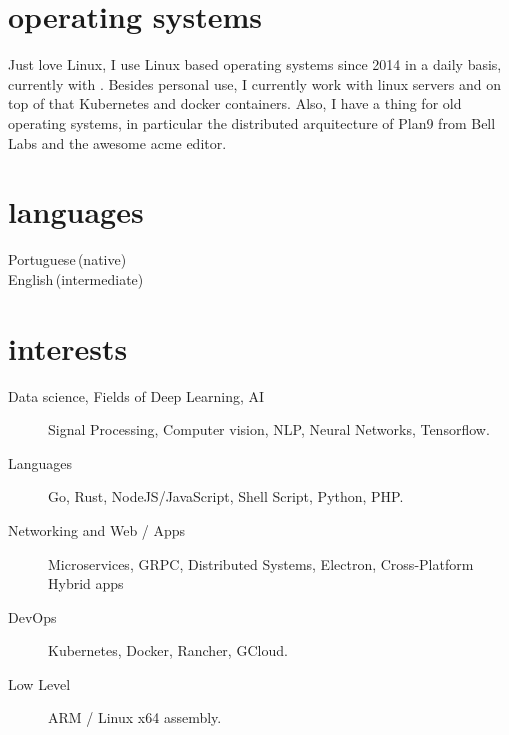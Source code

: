 \documentclass[]{cv-mauri}
\begin{document}
\section*{operating systems}
	Just love Linux, I use Linux based operating systems since 2014 in a daily basis, currently with \href{https://github.com/mauri870/dot-files}{\color{maincolor}{Arch linux and i3wm }}. Besides personal use, I currently work with linux servers and on top of that Kubernetes and docker containers. Also, I have a thing for old operating systems, in particular the distributed arquitecture of Plan9 from Bell Labs and the awesome acme editor.

\section*{languages}
\begin{tabularcv}
    Portuguese\,(native) \\
    English\,(intermediate)
\end{tabularcv}

\section*{interests}
	\begin{description}
		\item [Data science, Fields of Deep Learning, AI] Signal Processing, Computer vision, NLP, Neural Networks, Tensorflow.
		\item [Languages] Go, Rust, NodeJS/JavaScript, Shell Script, Python, PHP.
		\item [Networking and Web / Apps] Microservices, GRPC, Distributed Systems, Electron, Cross-Platform Hybrid apps
		\item [DevOps] Kubernetes, Docker, Rancher, GCloud.
		\item [Low Level] ARM / Linux x64 assembly.
	\end{description}
\end{document}

